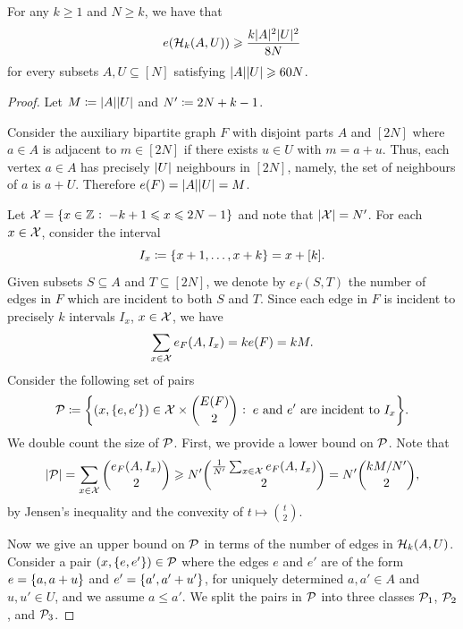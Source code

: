\documentclass[reqno,a4paper,12pt]{amsart}
\begin{document}
\begin{lemma}[Supersaturation]
    \label{lem:supersaturation}
    For any $k \geq 1$ and $N \geq k$, we have that
    \begin{equation*}
        e(\cH_k(A,U)) \geq \frac{k \card{A}^2 \card{U}^2}{8N}
    \end{equation*}
    for every subsets $A, U \subseteq [N]$ satisfying $\card{A}\card{U} \geq 60 N$.
\end{lemma}
\begin{proof}
    Let $M \defined \card{A}\card{U}$ and $N' \defined 2N + k - 1$.

    Consider the auxiliary bipartite graph $F$ with disjoint parts $A$ and $[2N]$ where $a \in A$ is adjacent to $m \in [2N]$ if there exists $u \in U$ with $m = a + u$.
    Thus, each vertex $a \in A$ has precisely $\card{U}$ neighbours in $[2N]$, namely, the set of neighbours of $a$ is $a + U$.
    Therefore $e(F) = \card{A} \card{U} = M$.

    Let $\cX = \set{x \in \ZZ \st -k+1 \leq x \leq 2N - 1}$ and note that $\card{\cX} = N'$.
    For each $x \in \cX$, consider the interval
    \begin{equation*}
        I_x \defined \set{x + 1, \dotsc, x + k} = x + [k].
    \end{equation*}
    Given subsets $S \subseteq A$ and $T \subseteq [2N]$, we denote by $e_F(S,T)$ the number of edges in $F$ which are incident to both $S$ and $T$.
    Since each edge in $F$ is incident to precisely $k$ intervals $I_x$, $x \in \cX$, we have
    \begin{equation*}
        \sum_{x \in \cX} e_F(A,I_x) = k e(F) = k M.
    \end{equation*}
    Consider the following set of pairs
    \begin{equation*}
        \cP \defined \set[\bigg]{(x, \set{e,e'}) \in \cX \times \binom{E(F)}{2} \st \text{$e$ and $e'$ are incident to $I_x$}}.
    \end{equation*}
    We double count the size of $\cP$.
    First, we provide a lower bound on $\cP$.
    Note that
    \begin{equation*}
        \card{\cP} = \sum_{x \in \cX} \binom{e_F(A,I_x)}{2} \geq N' \binom{\frac{1}{N'}\sum_{x \in \cX} e_F(A,I_x)}{2} = N' \binom{k M / N'}{2},
    \end{equation*}
    by Jensen's inequality and the convexity of $t \mapsto \binom{t}{2}$.

    Now we give an upper bound on $\cP$ in terms of the number of edges in $\cH_k(A,U)$.
    Consider a pair $(x,\set{e,e'}) \in \cP$ where the edges $e$ and $e'$ are of the form $e = \set{a, a + u}$ and $e' = \set{a', a' + u'}$, for uniquely determined $a, a' \in A$ and $u, u' \in U$, and we assume $a \leq a'$.
    We split the pairs in $\cP$ into three classes $\cP_1$, $\cP_2$, and $\cP_3$.


\end{proof}
\end{document}
